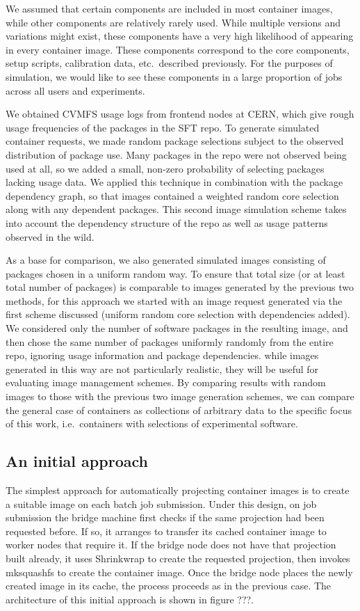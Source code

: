 \documentclass[sigconf]{acmart}
\begin{document}
We assumed that certain components are included in most container images,
while other components are relatively rarely used.
While multiple versions and variations might exist,
these components have a very high likelihood of appearing in every container image.
These components correspond to the core components, setup scripts, calibration data, etc.\ described previously.
For the purposes of simulation,
we would like to see these components in a large proportion of jobs across all users and experiments.

We obtained CVMFS usage logs from frontend nodes at CERN,
which give rough usage frequencies of the packages in the SFT repo.
To generate simulated container requests,
we made random package selections subject to the observed distribution of package use.
Many packages in the repo were not observed being used at all,
so we added a small, non-zero probability of selecting packages lacking usage data.
We applied this technique in combination with the package dependency graph,
so that images contained a weighted random core selection along with any dependent packages.
This second image simulation scheme takes into account the dependency structure of the repo as well as usage patterns observed in the wild.

As a base for comparison,
we also generated simulated images consisting of packages chosen in a uniform random way.
To ensure that total size (or at least total number of packages)
is comparable to images generated by the previous two methods,
for this approach we started with an image request generated via the first scheme discussed
(uniform random core selection with dependencies added).
We considered only the number of software packages in the resulting image,
and then chose the same number of packages uniformly randomly from the entire repo,
ignoring usage information and package dependencies.
while images generated in this way are not particularly realistic,
they will be useful for evaluating image management schemes.
By comparing results with random images to those with the previous two image generation schemes,
we can compare the general case of containers as collections of arbitrary data to the specific focus of this work,
i.e.\ containers with selections of experimental software.

\subsection{An initial approach}

The simplest approach for automatically projecting container images is to create a suitable image on each batch job submission.
Under this design,
on job submission the bridge machine first checks if the same projection had been requested before.
If so, it arranges to transfer its cached container image to worker nodes that require it.
If the bridge node does not have that projection built already,
it uses Shrinkwrap to create the requested projection,
then invokes mksquashfs to create the container image.
Once the bridge node places the newly created image in its cache,
the process proceeds as in the previous case.
The architecture of this initial approach is shown in figure ???.
\end{document}
